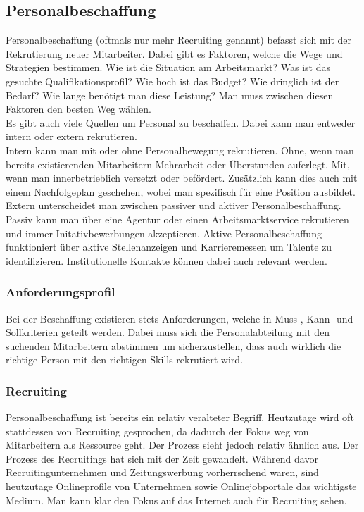 \documentclass{article}
\begin{document}
	 \subsection{Personalbeschaffung}
	 Personalbeschaffung (oftmals nur mehr Recruiting genannt) befasst sich mit der Rekrutierung neuer Mitarbeiter. Dabei gibt es Faktoren, welche die Wege und Strategien bestimmen. Wie ist die Situation am Arbeitsmarkt? Was ist das gesuchte Qualifikationsprofil? Wie hoch ist das Budget? Wie dringlich ist der Bedarf? Wie lange benötigt man diese Leistung? Man muss zwischen diesen Faktoren den besten Weg wählen. \\
	 Es gibt auch viele Quellen um Personal zu beschaffen. Dabei kann man entweder intern oder extern rekrutieren. \\
	 Intern kann man mit oder ohne Personalbewegung rekrutieren. Ohne, wenn man bereits existierenden Mitarbeitern Mehrarbeit oder Überstunden auferlegt. Mit, wenn man innerbetrieblich versetzt oder befördert. Zusätzlich kann dies auch mit einem Nachfolgeplan geschehen, wobei man spezifisch für eine Position ausbildet.\\
	 Extern unterscheidet man zwischen passiver und aktiver Personalbeschaffung. Passiv kann man über eine Agentur oder einen Arbeitsmarktservice rekrutieren und immer Initativbewerbungen akzeptieren. Aktive Personalbeschaffung funktioniert über aktive Stellenanzeigen und Karrieremessen um Talente zu identifizieren. Institutionelle Kontakte können dabei auch relevant werden. \\
	 \subsubsection{Anforderungsprofil}
	 Bei der Beschaffung existieren stets Anforderungen, welche in Muss-, Kann- und Sollkriterien geteilt werden. Dabei muss sich die Personalabteilung mit den suchenden Mitarbeitern abstimmen um sicherzustellen, dass auch wirklich die richtige Person mit den richtigen Skills rekrutiert wird.
	 \subsubsection{Recruiting}
	 Personalbeschaffung ist bereits ein relativ veralteter Begriff. Heutzutage wird oft stattdessen von Recruiting gesprochen, da dadurch der Fokus weg von Mitarbeitern als Ressource geht. Der Prozess sieht jedoch relativ ähnlich aus.
	 Der Prozess des Recruitings hat sich mit der Zeit gewandelt. Während davor Recruitingunternehmen und Zeitungswerbung vorherrschend waren, sind heutzutage Onlineprofile von Unternehmen sowie Onlinejobportale das wichtigste Medium. Man kann klar den Fokus auf das Internet auch für Recruiting sehen.
\end{document}
